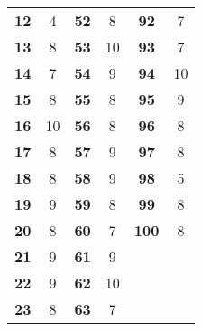 \begin{table}[]
\begin{tabular}{cccccc}
		\multicolumn{1}{l}{\textbf{12}} & 4                  & \multicolumn{1}{l}{\textbf{52}} & 8                  & \textbf{92}                   & 7                             \\
		\multicolumn{1}{l}{\textbf{13}} & 8                  & \multicolumn{1}{l}{\textbf{53}} & 10                 & \textbf{93}                   & 7                             \\
		\multicolumn{1}{l}{\textbf{14}} & 7                  & \multicolumn{1}{l}{\textbf{54}} & 9                  & \textbf{94}                   & 10                            \\
		\multicolumn{1}{l}{\textbf{15}} & 8                  & \multicolumn{1}{l}{\textbf{55}} & 8                  & \textbf{95}                   & 9                             \\
		\multicolumn{1}{l}{\textbf{16}} & 10                 & \multicolumn{1}{l}{\textbf{56}} & 8                  & \textbf{96}                   & 8                             \\
		\multicolumn{1}{l}{\textbf{17}} & 8                  & \multicolumn{1}{l}{\textbf{57}} & 9                  & \textbf{97}                   & 8                             \\
		\multicolumn{1}{l}{\textbf{18}} & 8                  & \multicolumn{1}{l}{\textbf{58}} & 9                  & \textbf{98}                   & 5                             \\
		\multicolumn{1}{l}{\textbf{19}} & 9                  & \multicolumn{1}{l}{\textbf{59}} & 8                  & \textbf{99}                   & 8                             \\
		\multicolumn{1}{l}{\textbf{20}} & 8                  & \multicolumn{1}{l}{\textbf{60}} & 7                  & \textbf{100}                  & 8                             \\
		\multicolumn{1}{l}{\textbf{21}} & 9                  & \multicolumn{1}{l}{\textbf{61}} & 9                  & \multicolumn{1}{l}{\textbf{}} & \multicolumn{1}{l}{\textbf{}} \\
		\multicolumn{1}{l}{\textbf{22}} & 9                  & \multicolumn{1}{l}{\textbf{62}} & 10                 & \multicolumn{1}{l}{\textbf{}} & \multicolumn{1}{l}{\textbf{}} \\
		\textbf{23}                     & 8                  & \textbf{63}                     & 7                  &                               &                               \\

\end{tabular}
\end{table}
